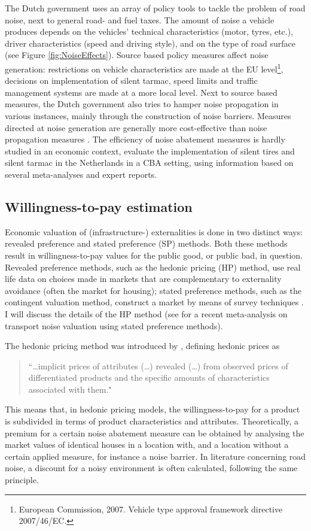 \documentclass[12pt]{scrartcl}
\begin{document}
		The Dutch government uses an array of policy tools to tackle the problem of road noise, next to general road- and fuel taxes. The amount of noise a vehicle produces depends on the vehicles' technical characteristics (motor, tyres, etc.), driver characteristics (speed and driving style), and on the type of road surface \citep{Nijland2003} (see Figure \ref{fig:NoiseEffects}). Source based policy measures affect noise generation: restrictions on vehicle characteristics are made at the EU level\footnote{European Commission, 2007.  Vehicle type approval framework directive 2007/46/EC.}, decisions on implementation of silent tarmac, speed limits and traffic management systems are made at a more local level. Next to source based measures, the Dutch government also tries to hamper noise propagation in various instances, mainly through the construction of noise barriers. Measures directed at noise generation are generally more cost-effective than noise propagation measures \citep{DenBoer2007}. The efficiency of noise abatement measures is hardly studied in an economic context, \cite{Nijland2003} evaluate the implementation of silent tires and silent tarmac in the Netherlands in a CBA setting, using information based on several meta-analyses and expert reports.
	
		\subsection{Willingness-to-pay estimation}

		Economic valuation of (infrastructure-) externalities is done in two distinct ways: revealed preference and stated preference (SP) methods. Both these methods result in willingness-to-pay values for the public good, or public bad, in question. Revealed preference methods, such as the hedonic pricing (HP) method, use real life data on choices made in markets that are complementary to externality avoidance (often the market for housing); stated preference methods, such as the contingent valuation method, construct a market by means of survey techniques \citep{Nelson2008}. I will discuss the details of the HP method (see \cite{Bristow2014} for a recent meta-analysis on transport noise valuation using stated preference methods). 
		
		The hedonic pricing method was introduced by \cite{Rosen1974}, defining hedonic prices as
		\begin{quote}``\dots implicit prices of attributes (\dots) revealed (\dots) from observed prices of differentiated products and the specific amounts of characteristics associated with them."\end{quote} 
		This means that, in hedonic pricing models, the willingness-to-pay for a product is subdivided in terms of product characteristics and attributes. Theoretically, a premium for a certain noise abatement measure can be obtained by analysing the market values of identical houses in a location with, and a location without a certain applied measure, for instance a noise barrier. In literature concerning road noise, a discount for a noisy environment is often calculated, following the same principle.
		
\end{document}
